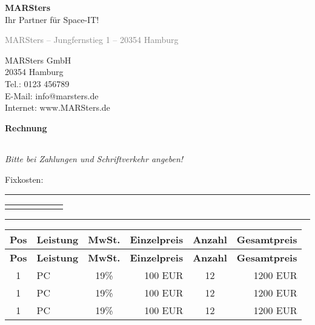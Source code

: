 \documentclass[12pt,a4paper]{article}
\begin{document}
\noindent
\raggedleft
\Huge\textbf{MARSters} \\[0.3em]
\large Ihr Partner für Space-IT! \\
\vspace{2em}
\begin{minipage}[t]{0.5\textwidth}
{\small \textcolor{gray}{MARSters – Jungfernstieg 1 – 20354 Hamburg}} \\[1em]

\end{minipage}
\hfill
\begin{minipage}[t]{0.45\textwidth}
\raggedleft
\vspace{1em}
MARSters GmbH \\
20354 Hamburg \\
Tel.: 0123 456789 \\
E-Mail: info@marsters.de \\
Internet: www.MARSters.de
\end{minipage}

\vspace{1.8em}

\textbf{\LARGE Rechnung}

\vspace{1em}
\begin{tabularx}{\textwidth}{@{}l X r@{}}

\end{tabularx}

\small\textit{Bitte bei Zahlungen und Schriftverkehr angeben!}

\vspace{1em}
Fixkosten:
\rule{\textwidth}{0.5pt}

\renewcommand{\arraystretch}{1.4}
\begin{tabularx}{\textwidth}{|c|X|c|r|c|r|}
\hline
\rowcolor{gray!30}


\end{tabularx}
\vspace{8.5em}
\rule{\textwidth}{0.5pt}


\renewcommand{\arraystretch}{1.4}
\begin{longtable}{|c|p{6cm}|c|r|c|r|}
\hline
\rowcolor{gray!30}
\textbf{Pos} & \textbf{Leistung} & \textbf{MwSt.} & \textbf{Einzelpreis} & \textbf{Anzahl} & \textbf{Gesamtpreis} \\
\hline
\endfirsthead

\hline
\rowcolor{gray!30}
\textbf{Pos} & \textbf{Leistung} & \textbf{MwSt.} & \textbf{Einzelpreis} & \textbf{Anzahl} & \textbf{Gesamtpreis} \\
\hline
\endhead

1 & PC & 19\% & 100 EUR & 12 & 1200 EUR \\
\hline
1 & PC & 19\% & 100 EUR & 12 & 1200 EUR \\
\hline
1 & PC & 19\% & 100 EUR & 12 & 1200 EUR \\
\hline
\end{longtable}
\end{document}
